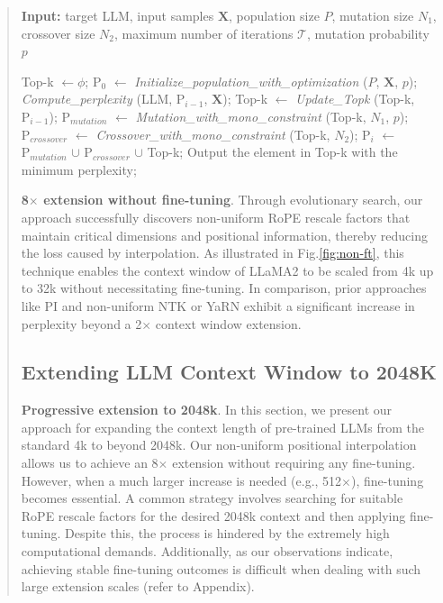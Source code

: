 \begin{abstract}
\begin{algorithm}[t]
	\small
	\caption{The search algorithm}
	\textbf{Input:} target LLM, input samples $\mathbf{X}$, population size $P$, mutation size $N_1$, crossover size $N_2$, maximum number of iterations $\mathcal{T}$, mutation probability $p$\\

	\begin{algorithmic}[1]
		\label{alg:search}
		\STATE Top-k $\leftarrow \phi$;	
		\STATE $\text{P}_0$ $\leftarrow$ \textit{Initialize\_population\_with\_optimization} ($P$, $\mathbf{X}$, $p$); 
		\STATE \textit{Compute\_perplexity} (LLM, $\text{P}_{i-1}$, $\mathbf{X}$);
		\STATE  Top-k $\leftarrow$ \textit{Update\_Topk} (Top-k, $\text{P}_{i-1}$);
		\STATE $\text{P}_{mutation}$ $\leftarrow$ \textit{Mutation\_with\_mono\_constraint} (Top-k, $N_1$, $p$); 
		\STATE $\text{P}_{crossover}$ $\leftarrow$ \textit{Crossover\_with\_mono\_constraint} (Top-k, $N_2$);
		\STATE $\text{P}_i$ $\leftarrow$ $\text{P}_{mutation}$ $\cup$ $\text{P}_{crossover}$ $\cup$ Top-k;
		\ENDFOR
		\STATE Output the element in Top-k with the minimum perplexity;
	\end{algorithmic}
\end{algorithm}

\textbf{8$\times$ extension without fine-tuning}. Through evolutionary search, our approach successfully discovers non-uniform RoPE rescale factors that maintain critical dimensions and positional information, thereby reducing the loss caused by interpolation. As illustrated in Fig.\ref{fig:non-ft}, this technique enables the context window of LLaMA2 to be scaled from 4k up to 32k without necessitating fine-tuning. In comparison, prior approaches like PI and non-uniform NTK or YaRN exhibit a significant increase in perplexity beyond a 2$\times$ context window extension.

\subsection{Extending LLM Context Window to 2048K}
\label{sec:extendto2048k}

\textbf{Progressive extension to 2048k}. In this section, we present our approach for expanding the context length of pre-trained LLMs from the standard 4k to beyond 2048k. Our non-uniform positional interpolation allows us to achieve an 8$\times$ extension without requiring any fine-tuning. However, when a much larger increase is needed (e.g., 512$\times$), fine-tuning becomes essential. A common strategy involves searching for suitable RoPE rescale factors for the desired 2048k context and then applying fine-tuning. Despite this, the process is hindered by the extremely high computational demands. Additionally, as our observations indicate, achieving stable fine-tuning outcomes is difficult when dealing with such large extension scales (refer to Appendix).


\end{abstract}
